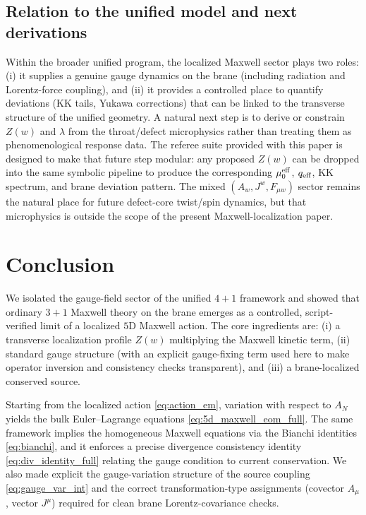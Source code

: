\documentclass[11pt]{article}
\newcommand{\A}{A}
\newcommand{\J}{J}
\newcommand{\Z}{Z}
\newcommand{\lam}{\lambda}      %
\newcommand{\qeff}{q_{\rm eff}}
\newcommand{\mueff}{\mu_0^{\rm eff}}
\begin{document}
\subsection{Relation to the unified model and next derivations}
Within the broader unified program, the localized Maxwell sector plays two roles:
(i) it supplies a genuine gauge dynamics on the brane (including radiation and
Lorentz-force coupling), and (ii) it provides a controlled place to quantify
deviations (KK tails, Yukawa corrections) that can be linked to the transverse
structure of the unified geometry. A natural next step is to derive or constrain
\(\Z(w)\) and \(\lam\) from the throat/defect microphysics rather than treating
them as phenomenological response data. The referee suite provided with this
paper is designed to make that future step modular: any proposed \(\Z(w)\) can be
dropped into the same symbolic pipeline to produce the corresponding
\(\mueff\), \(\qeff\), KK spectrum, and brane deviation pattern. The mixed
\((A_w,J^w,F_{\mu w})\) sector remains the natural place for future defect-core
twist/spin dynamics, but that microphysics is outside the scope of the present
Maxwell-localization paper.

\section{Conclusion}
\label{sec:conclusion}

We isolated the gauge-field sector of the unified \(4+1\) framework and showed
that ordinary \(3+1\) Maxwell theory on the brane emerges as a controlled,
script-verified limit of a localized \(5\)D Maxwell action. The core ingredients
are: (i) a transverse localization profile \(\Z(w)\) multiplying the Maxwell
kinetic term, (ii) standard gauge structure (with an explicit gauge-fixing term
used here to make operator inversion and consistency checks transparent), and
(iii) a brane-localized conserved source.

Starting from the localized action \cref{eq:action_em}, variation with respect to
\(\A_N\) yields the bulk Euler--Lagrange equations
\cref{eq:5d_maxwell_eom_full}. The same framework implies the homogeneous Maxwell
equations via the Bianchi identities \cref{eq:bianchi}, and it enforces a precise
divergence consistency identity \cref{eq:div_identity_full} relating the gauge
condition to current conservation. We also made explicit the gauge-variation
structure of the source coupling \cref{eq:gauge_var_int} and the correct
transformation-type assignments (covector \(\A_\mu\), vector \(\J^\mu\)) required
for clean brane Lorentz-covariance checks.
\end{document}
